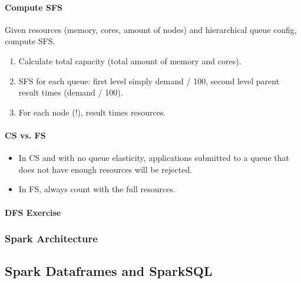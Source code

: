 \paragraph{Compute SFS}
Given resources (memory, cores, amount of nodes) and hierarchical queue config, compute SFS.
\begin{enumerate}
    \item Calculate total capacity (total amount of memory and cores).
    \item SFS for each queue: first level simply demand / 100, second level parent result times (demand / 100).
    \item For each node (!), result times resources.
\end{enumerate}

\paragraph{CS vs. FS}
\begin{itemize}
    \item In CS and with no queue elasticity, applications submitted to a queue that does not have enough resources will be rejected.
    \item In FS, always count with the full resources.
\end{itemize}

\paragraph{DFS Exercise}




\subsubsection{Spark Architecture}











\subsection{Spark Dataframes and SparkSQL}

